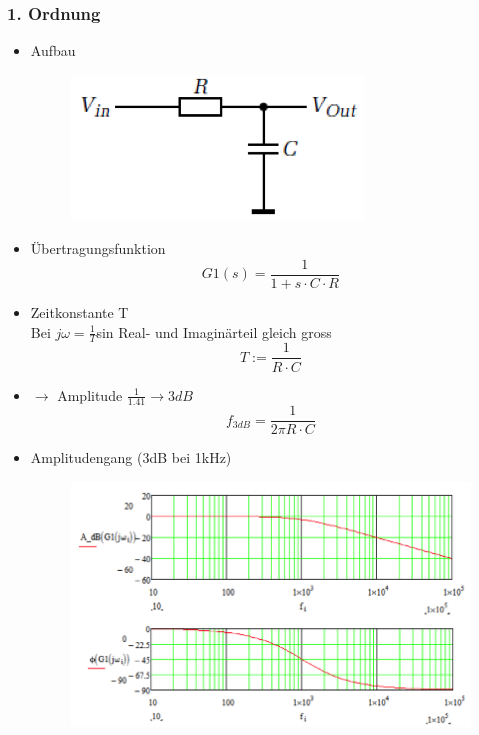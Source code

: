 \subsubsection{1. Ordnung}
\begin{itemize}
  \item Aufbau\\
  \begin{figure}[htb]
  \includegraphics[scale=0.4]{pictures/tiefpass1ordnung}
  \end{figure}
  \item Übertragungsfunktion 
  \begin{equation}
  G1(s)=\frac{1}{1+s\cdot C\cdot R}
  \end{equation}
  \item Zeitkonstante T\\
  Bei $j\omega=\frac{1}{T}$sin Real-  und Imaginärteil gleich gross
  \begin{equation}
  T:=\frac{1}{R\cdot C}
  \end{equation}
  \item $\to$ Amplitude $\frac{1}{1.41}\to 3dB$
  \begin{equation}
  f_{3dB}=\frac{1}{2\pi R\cdot C}
  \end{equation}
  \item Amplitudengang (3dB bei 1kHz)\\
  \begin{figure}[!htbs]
  \includegraphics[scale=0.5]{pictures/tiefpass1ordnungamplitude}
  \end{figure}
  
\end{itemize}


